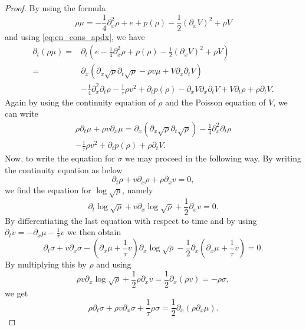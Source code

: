 \documentclass[leqno]{amsart}
\theoremstyle{plain}
\theoremstyle{definition}
\theoremstyle{remark}
\theoremstyle{plain}
\theoremstyle{plain}
\def\d{{\partial}}
\numberwithin{equation}{section}
\begin{document}
\begin{proof}
By using the formula 
\begin{equation*}
\rho \mu =-\frac14\d_x^2\rho +e +p(\rho )-\frac12(\d_xV )^2+\rho  V 
\end{equation*}
and using \eqref{eq:en_cons_apdx}, we have
\begin{equation*}
\begin{aligned}
\d_t(\rho \mu )=&\d_t\left(e -\frac14\d_x^2\rho +p(\rho )-\frac12(\d_xV )^2+\rho  V \right)\\
=&\d_x(\d_x\sqrt{\rho }\d_t\sqrt{\rho }-\rho  v \mu +V \d_x\d_tV )\\
&-\frac14\d_{x}^2\d_t\rho -\frac{1}{\tau}\rho  v^2 +\d_tp(\rho )-\d_xV \d_x\d_tV +V \d_t\rho +\rho \d_tV .
\end{aligned}
\end{equation*}
Again by using the continuity equation of $\rho$ and the Poisson equation of $V $, we can write
\begin{equation}\label{eq:mu_evol_apdx}
\begin{aligned}
\rho \d_t\mu +\rho  v \d_x\mu =\d_x(\d_x\sqrt{\rho }\d_t\sqrt{\rho })-\frac14\d_x^2\d_t\rho \\
-\frac{1}{\tau}\rho  v^2 +\d_tp(\rho )+\rho \d_tV .
\end{aligned}
\end{equation}
Now, to write the equation for $\sigma $ we may proceed in the following way. By writing the continuity equation as below
\begin{equation*}
\d_t\rho +v \d_x\rho +\rho \d_xv =0,
\end{equation*}
we find the equation for $\log\sqrt{\rho }$, namely
\begin{equation*}
\d_t\log\sqrt{\rho }+v\d_x\log\sqrt{\rho }+\frac12\d_xv =0.
\end{equation*}
By differentiating the last equation with respect to time and by using $\d_tv =-\d_x\mu -\frac{1}{\tau}v $ we then obtain
\begin{equation*}
\d_t\sigma +v \d_x\sigma -\left(\d_x\mu +\frac{1}{\tau}v\right)\d_x\log\sqrt{\rho }-\frac12\d_x\left(\d_x\mu +\frac{1}{\tau}v\right)=0.
\end{equation*}
By multiplying this by $\rho $ and using
\[
\rho  v \d_x\log\sqrt\rho +\frac12\rho \d_xv =\frac12\d_x(\rho  v )=-\rho \sigma ,
\]
we get
\begin{equation}\label{eq:sigma_evol_apdx}
\rho \d_t\sigma +\rho  v \d_x\sigma +\frac{1}{\tau}\rho \sigma =\frac12\d_x(\rho \d_x\mu ).
\end{equation}

\end{proof}
\end{document}
